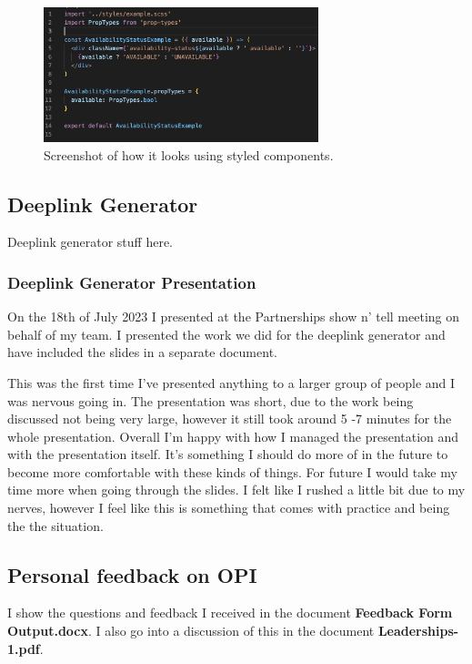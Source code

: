   \begin{figure}[H]
    \centering
    \includegraphics[width=8cm]{assets/styledCompsNew.png}
    \caption{Screenshot of how it looks using styled components.}
    \label{fig:newStyling}
  \end{figure}

  \subsection{Deeplink Generator}
  Deeplink generator stuff here.

    \subsubsection{Deeplink Generator Presentation}
    On the 18th of July 2023 I presented at the Partnerships show n' tell meeting on behalf of my team. I presented the work we did for the
    deeplink generator and have included the slides in a separate document.

    This was the first time I've presented anything to a larger group of people and I was nervous going in. The presentation was short, due to the work
    being discussed not being very large, however it still took around 5 -7 minutes for the whole presentation. Overall I'm happy with how I managed the 
    presentation and with the presentation itself. It's something I should do more of in the future to become more comfortable with these kinds of things.
    For future I would take my time more when going through the slides. I felt like I rushed a little bit due to my nerves, however I feel like this is 
    something that comes with practice and being the the situation. 

  \subsection{Personal feedback on OPI}
  I show the questions and feedback I received in the document \textbf{Feedback Form Output.docx}. I also go into a discussion of this in the document
  \textbf{Leaderships-1.pdf}.

